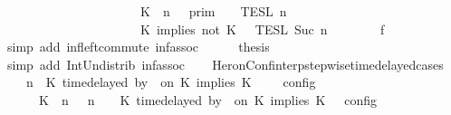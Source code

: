 \begin{isabellebody}
\ \ \ \ \ \ \ \ \ \ \ \ \ \ \ \ \ \ \ \ {\isasyminter}\ {\isasymlbrakk}{\isasymlbrakk}\ {\isacharparenleft}K\ {\isasymnot}{\isasymUp}\ n{\isacharparenright}\ {\isacharhash}\ {\isasymGamma}\ {\isasymrbrakk}{\isasymrbrakk}\isactrlsub p\isactrlsub r\isactrlsub i\isactrlsub m{\isacharparenright}\ {\isasyminter}\ {\isacharparenleft}{\isasymlbrakk}{\isasymlbrakk}\ {\isasymPsi}\ {\isasymrbrakk}{\isasymrbrakk}\isactrlsub T\isactrlsub E\isactrlsub S\isactrlsub L\isactrlbsup {\isasymge}\ n\isactrlesup \isanewline
\ \ \ \ \ \ \ \ \ \ \ \ \ \ \ \ \ \ \ \ {\isasyminter}\ {\isasymlbrakk}{\isasymlbrakk}\ {\isacharparenleft}K\ implies\ not\ K\ {\isacharhash}\ {\isasymPhi}\ {\isasymrbrakk}{\isasymrbrakk}\isactrlsub T\isactrlsub E\isactrlsub S\isactrlsub L\isactrlbsup {\isasymge}\ Suc\ n\isactrlesup {\isacharparenright}{\isacartoucheclose}\isanewline
\ \ \ \ \ \ \isamarkupfalse%
\ f{}\ \isamarkupfalse%
\ {\isacharparenleft}simp\ add{\isacharcolon}\ inf{\isacharunderscore}left{\isacharunderscore}commute\ inf{\isacharunderscore}assoc{\isacharparenright}\isanewline
\ \ \ \ \isamarkupfalse%
\ {\isacharquery}thesis\ \isamarkupfalse%
\ {\isacharparenleft}simp\ add{\isacharcolon}\ Int{\isacharunderscore}Un{\isacharunderscore}distrib{}\ inf{\isacharunderscore}assoc{\isacharparenright}\isanewline
\ \ \isamarkupfalse%
\isanewline
{}\isamarkupfalse%
%
\endisatagproof
{\isafoldproof}%
%
\isadelimproof
\isanewline
%
\endisadelimproof
\isanewline
{}\isamarkupfalse%
\ HeronConf{\isacharunderscore}interp{\isacharunderscore}stepwise{\isacharunderscore}timedelayed{\isacharunderscore}cases{\isacharcolon}\isanewline
\ \ {\isacartoucheopen}{\isasymlbrakk}\ {\isasymGamma}{\isacharcomma}\ n\ {\isasymturnstile}\ {\isacharparenleft}{\isacharparenleft}K\ time{\isacharminus}delayed\ by\ {\isasymdelta}{\isasymtau}\ on\ K\ implies\ K\ {\isacharhash}\ {\isasymPsi}{\isacharparenright}\ {\isasymtriangleright}\ {\isasymPhi}\ {\isasymrbrakk}\isactrlsub c\isactrlsub o\isactrlsub n\isactrlsub f\isactrlsub i\isactrlsub g\isanewline
\ \ \ \ {\isacharequal}\ {\isasymlbrakk}\ {\isacharparenleft}{\isacharparenleft}K\ {\isasymnot}{\isasymUp}\ n{\isacharparenright}\ {\isacharhash}\ {\isasymGamma}{\isacharparenright}{\isacharcomma}\ n\ {\isasymturnstile}\ {\isasymPsi}\ {\isasymtriangleright}\ {\isacharparenleft}{\isacharparenleft}K\ time{\isacharminus}delayed\ by\ {\isasymdelta}{\isasymtau}\ on\ K\ implies\ K\ {\isacharhash}\ {\isasymPhi}{\isacharparenright}\ {\isasymrbrakk}\isactrlsub c\isactrlsub o\isactrlsub n\isactrlsub f\isactrlsub i\isactrlsub g\isanewline

\end{isabellebody}
